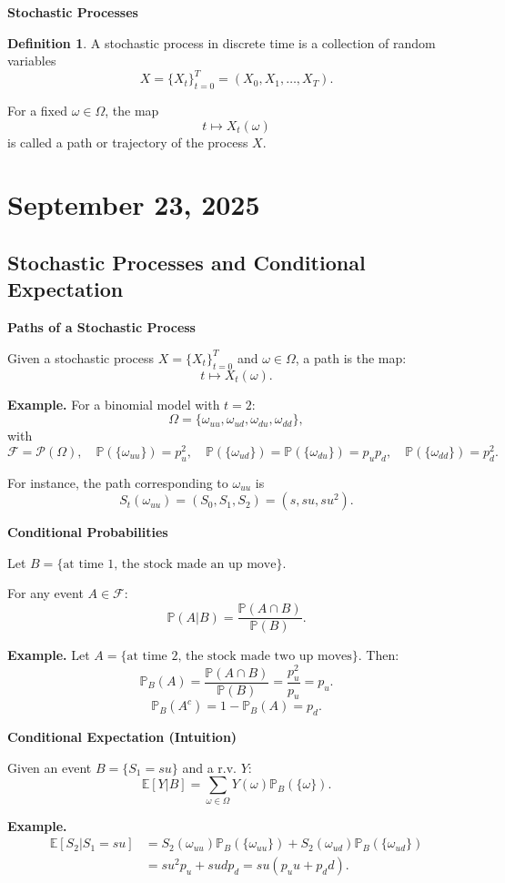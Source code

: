 \documentclass[12pt,a4paper]{article}
\theoremstyle{definition}
\newtheorem{definition}{Definition}[section]
\newcommand{\E}{\mathbb{E}}
\newcommand{\Prob}{\mathbb{P}}
\begin{document}
\textbf{Stochastic Processes}

\begin{definition}
A stochastic process in discrete time is a collection of random variables
\[
X = \{X_t\}_{t=0}^T = (X_0, X_1, \ldots, X_T).
\]

For a fixed $\omega \in \Omega$, the map
\[
t \mapsto X_t(\omega)
\]
is called a path or trajectory of the process $X$.
\end{definition}

\newpage
\section{September 23, 2025}

\subsection{Stochastic Processes and Conditional Expectation}

\textbf{Paths of a Stochastic Process}

Given a stochastic process $X = \{X_t\}_{t=0}^T$ and $\omega \in \Omega$, a path is the map:
\[
t \mapsto X_t(\omega).
\]

\textbf{Example.}
For a binomial model with $t = 2$:
\[
\Omega = \{\omega_{uu}, \omega_{ud}, \omega_{du}, \omega_{dd}\},
\]
with
\[
\mathcal{F} = \mathcal{P}(\Omega), \quad \Prob(\{\omega_{uu}\}) = p_u^2, \quad \Prob(\{\omega_{ud}\}) = \Prob(\{\omega_{du}\}) = p_u p_d, \quad \Prob(\{\omega_{dd}\}) = p_d^2.
\]

For instance, the path corresponding to $\omega_{uu}$ is
\[
S_t(\omega_{uu}) = (S_0, S_1, S_2) = (s, su, su^2).
\]

\textbf{Conditional Probabilities}

Let $B = \{\text{at time 1, the stock made an up move}\}$.

For any event $A \in \mathcal{F}$:
\[
\Prob(A|B) = \frac{\Prob(A \cap B)}{\Prob(B)}.
\]

\textbf{Example.}
Let $A = \{\text{at time 2, the stock made two up moves}\}$. Then:
\[
\Prob_B(A) = \frac{\Prob(A \cap B)}{\Prob(B)} = \frac{p_u^2}{p_u} = p_u.
\]
\[
\Prob_B(A^c) = 1 - \Prob_B(A) = p_d.
\]

\textbf{Conditional Expectation (Intuition)}

Given an event $B = \{S_1 = su\}$ and a r.v. $Y$:
\[
\E[Y|B] = \sum_{\omega \in \Omega} Y(\omega) \Prob_B(\{\omega\}).
\]

\textbf{Example.}
\begin{align}
\E[S_2|S_1 = su] &= S_2(\omega_{uu}) \Prob_B(\{\omega_{uu}\}) + S_2(\omega_{ud}) \Prob_B(\{\omega_{ud}\}) \\
&= su^2 p_u + sud p_d = su(p_u u + p_d d).
\end{align}
\end{document}
